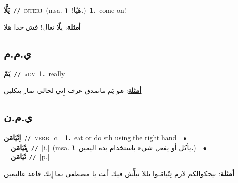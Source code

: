 \documentclass[10pt,a4paper,twoside]{article} %
\begin{document}
\begin{multicols}{2}
{{{{{{\setlength\topsep{0pt}\textbf{\foreignlanguage{arabic}{يَلَّا}}\ {\color{gray}\texttt{//}\color{black}}\ \textsc{interj}\ \color{gray}(msa. \foreignlanguage{arabic}{هَيّا!}~\foreignlanguage{arabic}{\textbf{١.}})\color{black}\ \textbf{1.}~come on!\  \begin{flushright}\color{gray}\foreignlanguage{arabic}{\textbf{\underline{\foreignlanguage{arabic}{أمثلة}}}: يلّا تعال! فش حدا هلا}\end{flushright}\color{black}} \vspace{2mm}

\vspace{-3mm}
\subsection*{\color{blue}\foreignlanguage{arabic}{ي.م.م}\color{blue}{ (ntws)}} 

{\setlength\topsep{0pt}\textbf{\foreignlanguage{arabic}{يَمّ}}\ {\color{gray}\texttt{//}\color{black}}\ \textsc{adv}\ \textbf{1.}~really\  \begin{flushright}\color{gray}\foreignlanguage{arabic}{\textbf{\underline{\foreignlanguage{arabic}{أمثلة}}}: هو يَم ماصدق عرف إِني لحالي صار يتكلبن}\end{flushright}\color{black}} \vspace{2mm}

\vspace{-3mm}
\subsection*{\color{blue}\foreignlanguage{arabic}{ي.م.ن}\color{blue}{}} 

{\setlength\topsep{0pt}\textbf{\foreignlanguage{arabic}{اِتْيَامَن}}\ {\color{gray}\texttt{//}\color{black}}\ \textsc{verb}\ [c.]\ \textbf{1.}~eat or do sth using the right hand\ \ $\bullet$\ \ \setlength\topsep{0pt}\textbf{\foreignlanguage{arabic}{يِتْيَامَن}}\ {\color{gray}\texttt{//}\color{black}}\ [i.]\ \color{gray}(msa. \foreignlanguage{arabic}{يأكل أو يفعل شيء باستخدام يده اليمين}~\foreignlanguage{arabic}{\textbf{١.}})\color{black}\ \ $\bullet$\ \ \setlength\topsep{0pt}\textbf{\foreignlanguage{arabic}{تْيَامَن}}\ {\color{gray}\texttt{//}\color{black}}\ [p.]\  \begin{flushright}\color{gray}\foreignlanguage{arabic}{\textbf{\underline{\foreignlanguage{arabic}{أمثلة}}}: بيحكوالكم لازم تِتْيامَنوا يللا نبلِّش فيك أنت يا مصطفى بما إِنك قاعد عاليمين}\end{flushright}\color{black}} \vspace{2mm}

}}}}}
\end{multicols}
\end{document}
